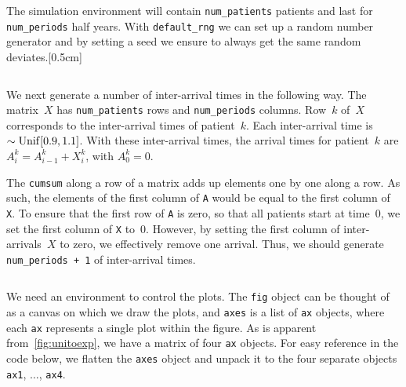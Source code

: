 \documentclass[stochastic-or.tex]{subfiles}
\begin{document}
The simulation environment will contain \texttt{num_patients} patients and last for \texttt{num_periods} half years.
With \texttt{default_rng} we can set up a random number generator and by setting a seed
we  ensure to always get the same random deviates.[0.5cm]
\inputminted[firstline=29, lastline=31]{python}{../code/IBD_simulations.py} %

We next generate a number of inter-arrival times in the following way.
The matrix~$X$ has \texttt{num_patients} rows and \texttt{num_periods} columns.
Row~$k$ of~$X$ corresponds to the inter-arrival times of patient~$k$.
Each inter-arrival time is $\sim\mathrm{Unif}[0.9, 1.1]$.
With these inter-arrival times, the arrival times for patient~$k$ are $A_{i}^{k} = A_{i-1}^{k} + X_{i}^{k}$, with $A_0^{k}=0$.

The \texttt{cumsum} along a row of a matrix adds up elements one by one along a row.
As such, the elements of the first column of \texttt{A} would be equal to the first column of \texttt{X}.
To ensure that the first row of \texttt{A} is zero, so that all patients start at time~$0$, we set the first column of \texttt{X} to~$0$.
However, by setting the first column of inter-arrivals~$X$ to zero, we effectively remove one arrival.
Thus, we should generate \texttt{num_periods + 1} of inter-arrival times.

\inputminted[firstline=35, lastline=37]{python}{../code/IBD_simulations.py} %


We need an environment to control the plots.
The \texttt{fig} object can be thought of as a canvas on which we draw the plots, and \texttt{axes} is a list of \texttt{ax} objects, where each \texttt{ax} represents a single plot within the figure.
As is apparent from~\cref{fig:unitoexp}, we have a matrix of four \texttt{ax} objects.
For easy reference in the code below, we flatten
the \texttt{axes} object and unpack it to the four separate objects \texttt{ax1}, $\ldots$, \texttt{ax4}.
\inputminted[firstline=42, lastline=43]{python}{../code/IBD_simulations.py} %
\end{document}
